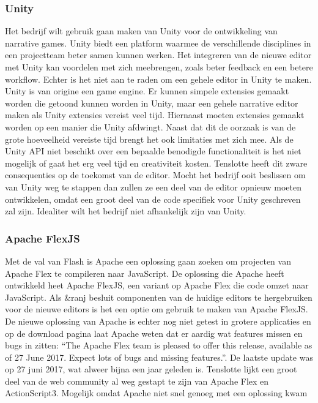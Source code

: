 \pagebreak
\subsubsection{Unity}
Het bedrijf wilt gebruik gaan maken van Unity voor de ontwikkeling van narrative games. Unity biedt een platform waarmee de verschillende disciplines in een projectteam beter samen kunnen werken. Het integreren van de nieuwe editor met Unity kan voordelen met zich meebrengen, zoals beter feedback en een betere workflow.
Echter is het niet aan te raden om een gehele editor in Unity te maken. Unity is van origine een game engine. Er kunnen simpele extensies gemaakt worden die getoond kunnen worden in Unity, maar een gehele narrative editor maken als Unity extensies vereist veel tijd. Hiernaast moeten extensies gemaakt worden op een manier die Unity afdwingt. Naast dat dit de oorzaak is van de grote hoeveelheid vereiste tijd brengt het ook limitaties met zich mee. Als de Unity API niet beschikt over een bepaalde benodigde functionaliteit is het niet mogelijk of gaat het erg veel tijd en creativiteit kosten.
Tenslotte heeft dit zware consequenties op de toekomst van de editor. Mocht het bedrijf ooit beslissen om van Unity weg te stappen dan zullen ze een deel van de editor opnieuw moeten ontwikkelen, omdat een groot deel van de code specifiek voor Unity geschreven zal zijn. Idealiter wilt het bedrijf niet afhankelijk zijn van Unity.

\subsubsection{Apache FlexJS}
Met de val van Flash is Apache een oplossing gaan zoeken om projecten van Apache Flex te compileren naar JavaScript. De oplossing die Apache heeft ontwikkeld heet Apache FlexJS, een variant op Apache Flex die code omzet naar JavaScript\cite{WhatIsApacheFlexJS}. Als \&ranj besluit componenten van de huidige editors te hergebruiken voor de nieuwe editors is het een optie om gebruik te maken van Apache FlexJS.
De nieuwe oplossing van Apache is echter nog niet getest in grotere applicaties en op de download pagina laat Apache weten dat er aardig wat features missen en bugs in zitten: “The Apache Flex team is pleased to offer this release, available as of 27 June 2017. Expect lots of bugs and missing features.”\cite{ApacheFlexJSDownload}. De laatste update was op 27 juni 2017, wat alweer bijna een jaar geleden is.
Tenslotte lijkt een groot deel van de web community al weg gestapt te zijn van Apache Flex en ActionScript3. Mogelijk omdat Apache niet snel genoeg met een oplossing kwam

